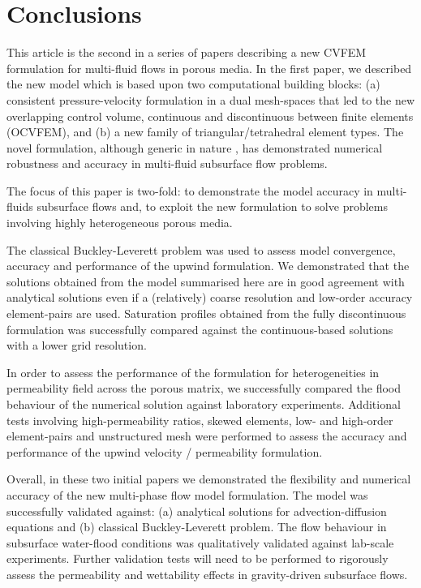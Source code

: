 \documentclass[preprint,authoryear,12pt]{elsarticle}
\begin{document}
\section{Conclusions}\label{conc}
This article is the second in a series of papers describing a new
CVFEM formulation for multi-fluid flows in porous media. In the first
paper, we described the new model which is based upon two
computational building blocks: (a) consistent pressure-velocity
formulation in a dual mesh-spaces that led to the new overlapping
control volume, continuous and discontinuous between finite elements
(OCVFEM), and (b) a new family of triangular/tetrahedral element
types. The novel formulation, although generic in nature \citep[thus
  not restricted to porous media applications as demonstrated by][for
  interface tracking problems]{pavlidis_2013b,pavlidis_2013c}, has
demonstrated numerical robustness and accuracy in multi-fluid
subsurface flow problems.

The focus of this paper is two-fold: to demonstrate the model accuracy
in multi-fluids subsurface flows and, to exploit the new formulation
to solve problems involving highly heterogeneous porous media.

The classical Buckley-Leverett problem was used to assess model
convergence, accuracy and performance of the upwind formulation. We
demonstrated that the solutions obtained from the model summarised
here \citep[see][for a full description]{gomes_2013} are in good
agreement with analytical solutions even if a (relatively) coarse
resolution and low-order accuracy element-pairs are used.  Saturation
profiles obtained from the fully discontinuous formulation was
successfully compared against the continuous-based solutions with a
lower grid resolution.

In order to assess the performance of the formulation for
heterogeneities in permeability field across the porous matrix, we
successfully compared the flood behaviour of the numerical solution
against laboratory experiments. Additional tests involving
high-permeability ratios, skewed elements, low- and high-order
element-pairs and unstructured mesh were performed to assess the
accuracy and performance of the upwind velocity / permeability
formulation.

Overall, in these two initial papers we demonstrated the flexibility
and numerical accuracy of the new multi-phase flow model
formulation. The model was successfully validated against: (a)
analytical solutions for advection-diffusion equations and (b)
classical Buckley-Leverett problem. The flow behaviour in subsurface
water-flood conditions was qualitatively validated against lab-scale
experiments. Further validation tests will need to be performed to
rigorously assess the permeability and wettability effects in
gravity-driven subsurface flows.
\end{document}
